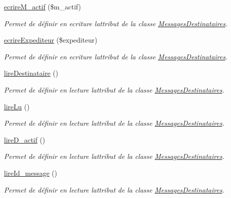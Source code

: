 \begin{DoxyCompactItemize}
\hyperlink{class_messages_destinataires_a677ba8293e169ff636bfb9bf5c454abc}{ecrire\+M\+\_\+actif} (\$m\+\_\+actif)
\begin{DoxyCompactList}\small\item\em Permet de définir en ecriture l\textquotesingle{}attribut de la classe \hyperlink{class_messages_destinataires}{Messages\+Destinataires}. \end{DoxyCompactList}\item 
\hyperlink{class_messages_destinataires_ae31ccfd3f4ba85513c3560aff67917f9}{ecrire\+Expediteur} (\$expediteur)
\begin{DoxyCompactList}\small\item\em Permet de définir en ecriture l\textquotesingle{}attribut de la classe \hyperlink{class_messages_destinataires}{Messages\+Destinataires}. \end{DoxyCompactList}\item 
\hyperlink{class_messages_destinataires_a1047fa229ad3a1d059ef7d9868f08080}{lire\+Destinataire} ()
\begin{DoxyCompactList}\small\item\em Permet de définir en lecture l\textquotesingle{}attribut de la classe \hyperlink{class_messages_destinataires}{Messages\+Destinataires}. \end{DoxyCompactList}\item 
\hyperlink{class_messages_destinataires_a87c02935ce0ce0568b5f2260feb3862b}{lire\+Lu} ()
\begin{DoxyCompactList}\small\item\em Permet de définir en lecture l\textquotesingle{}attribut de la classe \hyperlink{class_messages_destinataires}{Messages\+Destinataires}. \end{DoxyCompactList}\item 
\hyperlink{class_messages_destinataires_a2c74a36fd087103db15895627429f525}{lire\+D\+\_\+actif} ()
\begin{DoxyCompactList}\small\item\em Permet de définir en lecture l\textquotesingle{}attribut de la classe \hyperlink{class_messages_destinataires}{Messages\+Destinataires}. \end{DoxyCompactList}\item 
\hyperlink{class_messages_destinataires_a87b80bdd09ff512ccdb198491c61198d}{lire\+Id\+\_\+message} ()
\begin{DoxyCompactList}\small\item\em Permet de définir en lecture l\textquotesingle{}attribut de la classe \hyperlink{class_messages_destinataires}{Messages\+Destinataires}. \end{DoxyCompactList}\item 

\end{DoxyCompactItemize}
